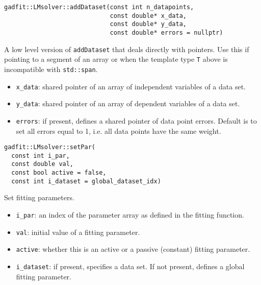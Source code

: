 \documentclass{article}
\begin{document}
\begin{verbatim}
gadfit::LMsolver::addDataset(const int n_datapoints,
                             const double* x_data,
                             const double* y_data,
                             const double* errors = nullptr)
\end{verbatim}
A low level version of \texttt{addDataset} that deals directly with pointers. Use this if pointing to a segment of an array or when the template type \texttt{T} above is incompatible with \texttt{std::span}.
\begin{itemize}
\item \verb+x_data+: shared pointer of an array of independent variables of a data set.
\item \verb+y_data+: shared pointer of an array of dependent variables of a data set.
\item \verb+errors+: if present, defines a shared pointer of data point errors. Default is to set all errors equal to 1, i.e. all data points have the same weight.
\end{itemize}

\begin{verbatim}
gadfit::LMsolver::setPar(
  const int i_par,
  const double val,
  const bool active = false,
  const int i_dataset = global_dataset_idx)
\end{verbatim}
Set fitting parameters.
\begin{itemize}
\item \verb+i_par+: an index of the parameter array as defined in the fitting function.
\item \verb+val+: initial value of a fitting parameter.
\item \verb+active+: whether this is an active or a passive (constant) fitting parameter.
\item \verb+i_dataset+: if present, specifies a data set. If not present, defines a global fitting parameter.
\end{itemize}
\end{document}
